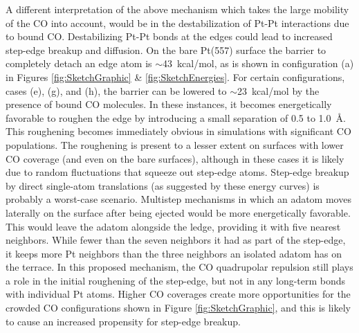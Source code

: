 \documentclass[journal = jpccck, manuscript = article]{achemso}
\begin{document}
A different interpretation of the above mechanism which takes the
large mobility of the CO into account, would be in the destabilization
of Pt-Pt interactions due to bound CO.  Destabilizing Pt-Pt bonds at
the edges could lead to increased step-edge breakup and diffusion. On
the bare Pt(557) surface the barrier to completely detach an edge atom
is $\sim$43~kcal/mol, as is shown in configuration (a) in Figures
\ref{fig:SketchGraphic} \& \ref{fig:SketchEnergies}. For certain
configurations, cases (e), (g), and (h), the barrier can be lowered to
$\sim$23~kcal/mol by the presence of bound CO molecules. In these
instances, it becomes energetically favorable to roughen the edge by
introducing a small separation of 0.5 to 1.0~\AA. This roughening
becomes immediately obvious in simulations with significant CO
populations. The roughening is present to a lesser extent on surfaces
with lower CO coverage (and even on the bare surfaces), although in
these cases it is likely due to random fluctuations that squeeze out
step-edge atoms. Step-edge breakup by direct single-atom translations
(as suggested by these energy curves) is probably a worst-case
scenario.  Multistep mechanisms in which an adatom moves laterally on
the surface after being ejected would be more energetically favorable.
This would leave the adatom alongside the ledge, providing it with
five nearest neighbors.  While fewer than the seven neighbors it had
as part of the step-edge, it keeps more Pt neighbors than the three
neighbors an isolated adatom has on the terrace. In this proposed
mechanism, the CO quadrupolar repulsion still plays a role in the
initial roughening of the step-edge, but not in any long-term bonds
with individual Pt atoms.  Higher CO coverages create more
opportunities for the crowded CO configurations shown in Figure
\ref{fig:SketchGraphic}, and this is likely to cause an increased
propensity for step-edge breakup.
\end{document}
